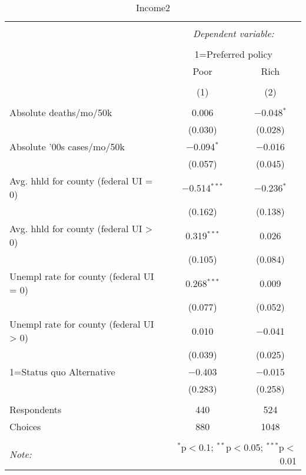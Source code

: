 
\begin{table}[!htbp] \centering 
  \caption{Income2} 
  \label{} 
\begin{tabular}{@{\extracolsep{5pt}}lcc} 
\\[-1.8ex]\hline 
\hline \\[-1.8ex] 
 & \multicolumn{2}{c}{\textit{Dependent variable:}} \\ 
\cline{2-3} 
\\[-1.8ex] & \multicolumn{2}{c}{1=Preferred policy} \\ 
 & Poor & Rich \\ 
\\[-1.8ex] & (1) & (2)\\ 
\hline \\[-1.8ex] 
 Absolute deaths/mo/50k & 0.006 & $-$0.048$^{*}$ \\ 
  & (0.030) & (0.028) \\ 
  Absolute '00s cases/mo/50k & $-$0.094$^{*}$ & $-$0.016 \\ 
  & (0.057) & (0.045) \\ 
  Avg. hhld  for county (federal UI = 0) & $-$0.514$^{***}$ & $-$0.236$^{*}$ \\ 
  & (0.162) & (0.138) \\ 
  Avg. hhld  for county (federal UI > 0) & 0.319$^{***}$ & 0.026 \\ 
  & (0.105) & (0.084) \\ 
  Unempl rate for county (federal UI = 0) & 0.268$^{***}$ & 0.009 \\ 
  & (0.077) & (0.052) \\ 
  Unempl rate for county (federal UI > 0) & 0.010 & $-$0.041 \\ 
  & (0.039) & (0.025) \\ 
  1=Status quo Alternative & $-$0.403 & $-$0.015 \\ 
  & (0.283) & (0.258) \\ 
 \hline \\[-1.8ex] 
Respondents & 440 & 524\\ 
 Choices & 880 & 1048\\ 
\hline 
\hline \\[-1.8ex] 
\textit{Note:}  & \multicolumn{2}{r}{$^{*}$p$<$0.1; $^{**}$p$<$0.05; $^{***}$p$<$0.01} \\ 
\end{tabular} 
\end{table} 
